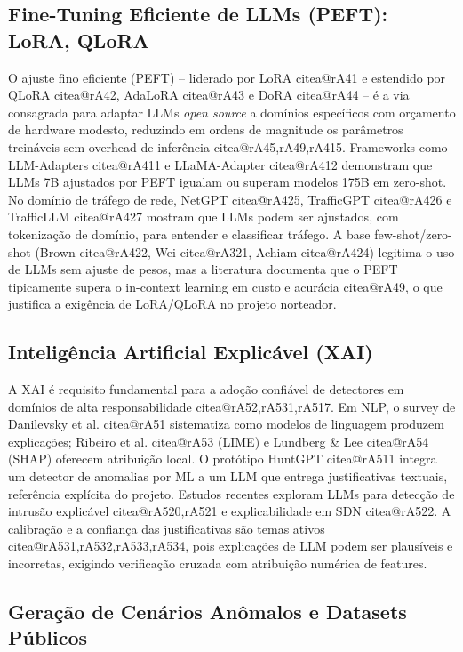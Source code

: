 \documentclass[12pt,a4paper]{article}
\makeatletter
\newcommand{\citea}[1]{\begingroup\edef\@currentlabel{\csname citea@#1\endcsname}\@currentlabel\endgroup}
\makeatother
\begin{document}
\subsection{Fine-Tuning Eficiente de LLMs (PEFT): LoRA, QLoRA}
\label{sec:peft}

O ajuste fino eficiente (PEFT) -- liderado por LoRA \citea{rA41} e estendido
por QLoRA \citea{rA42}, AdaLoRA \citea{rA43} e DoRA \citea{rA44} -- é a via
consagrada para adaptar LLMs \textit{open source} a domínios específicos com
orçamento de hardware modesto, reduzindo em ordens de magnitude os parâmetros
treináveis sem overhead de inferência \citea{rA45,rA49,rA415}. Frameworks como
LLM-Adapters \citea{rA411} e LLaMA-Adapter \citea{rA412} demonstram que LLMs
7B ajustados por PEFT igualam ou superam modelos 175B em zero-shot. No
domínio de tráfego de rede, NetGPT \citea{rA425}, TrafficGPT \citea{rA426} e
TrafficLLM \citea{rA427} mostram que LLMs podem ser ajustados, com tokenização
de domínio, para entender e classificar tráfego. A base few-shot/zero-shot
(Brown \citea{rA422}, Wei \citea{rA321}, Achiam \citea{rA424}) legitima o uso de
LLMs sem ajuste de pesos, mas a literatura documenta que o PEFT tipicamente
supera o in-context learning em custo e acurácia \citea{rA49}, o que justifica
a exigência de LoRA/QLoRA no projeto norteador.

\subsection{Inteligência Artificial Explicável (XAI)}
\label{sec:xai}

A XAI é requisito fundamental para a adoção confiável de detectores em
domínios de alta responsabilidade \citea{rA52,rA531,rA517}. Em NLP, o survey
de Danilevsky et al. \citea{rA51} sistematiza como modelos de linguagem
produzem explicações; Ribeiro et al. \citea{rA53} (LIME) e Lundberg \& Lee
\citea{rA54} (SHAP) oferecem atribuição local. O protótipo HuntGPT
\citea{rA511} integra um detector de anomalias por ML a um LLM que entrega
justificativas textuais, referência explícita do projeto. Estudos recentes
exploram LLMs para detecção de intrusão explicável \citea{rA520,rA521} e
explicabilidade em SDN \citea{rA522}. A calibração e a confiança das
justificativas são temas ativos \citea{rA531,rA532,rA533,rA534}, pois
explicações de LLM podem ser plausíveis e incorretas, exigindo verificação
cruzada com atribuição numérica de features.

\subsection{Geração de Cenários Anômalos e Datasets Públicos}
\label{sec:datasets}
\end{document}
